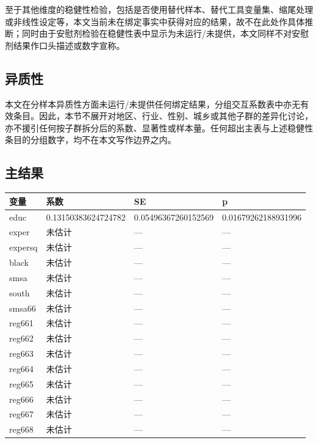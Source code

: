 \documentclass[12pt,a4paper]{article}
\begin{document}
至于其他维度的稳健性检验，包括是否使用替代样本、替代工具变量集、缩尾处理或非线性设定等，本文当前未在绑定事实中获得对应的结果，故不在此处作具体推断；同时由于安慰剂检验在稳健性表中显示为未运行/未提供，本文同样不对安慰剂结果作口头描述或数字宣称。

\subsection{异质性}

本文在分样本异质性方面未运行/未提供任何绑定结果，分组交互系数表中亦无有效条目。因此，本节不展开对地区、行业、性别、城乡或其他子群的差异化讨论，亦不援引任何按子群拆分后的系数、显著性或样本量。任何超出主表与上述稳健性条目的分组数字，均不在本文写作边界之内。

\subsection*{主结果}

\begin{tabular}{llll}
\toprule
变量 & 系数 & SE & p \\
\midrule
educ & 0.13150383624724782 & 0.05496367260152569 & 0.01679262188931996 \\
exper & 未估计 & — & — \\
expersq & 未估计 & — & — \\
black & 未估计 & — & — \\
smsa & 未估计 & — & — \\
south & 未估计 & — & — \\
smsa66 & 未估计 & — & — \\
reg661 & 未估计 & — & — \\
reg662 & 未估计 & — & — \\
reg663 & 未估计 & — & — \\
reg664 & 未估计 & — & — \\
reg665 & 未估计 & — & — \\
reg666 & 未估计 & — & — \\
reg667 & 未估计 & — & — \\
reg668 & 未估计 & — & — \\
\bottomrule
\end{tabular}
\end{document}
